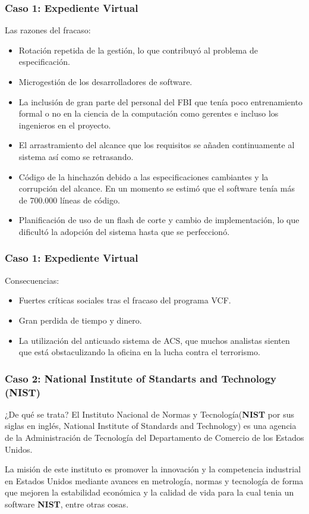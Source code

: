 \documentclass[11pt]{beamer}
\begin{document}
	\begin{frame}
		\frametitle{Caso 1: Expediente Virtual}
		\begin{block}{Las razones del fracaso:}
			\begin{itemize}
				\item Rotación repetida de la gestión, lo que contribuyó al problema de especificación.
				\item Microgestión de los desarrolladores de software.
				\item La inclusión de gran parte del personal del FBI que tenía poco entrenamiento formal o no en la ciencia de la computación como gerentes e incluso los ingenieros en el proyecto.
				\item El arrastramiento del alcance que los requisitos se añaden continuamente al sistema así como se retrasando.
				\item Código de la hinchazón debido a las especificaciones cambiantes y la corrupción del alcance. En un momento se estimó que el software tenía más de 700.000 líneas de código.
				\item Planificación de uso de un flash de corte y cambio de implementación, lo que dificultó la adopción del sistema hasta que se perfeccionó.
			\end{itemize}
		\end{block}
	\end{frame}

	\begin{frame}
		\frametitle{Caso 1: Expediente Virtual}
		\begin{block}{Consecuencias:}
			\begin{itemize}
				\item Fuertes críticas sociales tras el fracaso del programa VCF.
				\item Gran perdida de tiempo y dinero.
				\item La utilización del anticuado sistema de ACS, que muchos analistas sienten que está obstaculizando la oficina en la lucha contra el terrorismo.
			\end{itemize}
		\end{block}
	\end{frame}

	\begin{frame}
		\frametitle{Caso 2: National Institute of Standarts and Technology (NIST)}
		\begin{block}{¿De qué se trata?}
			El Instituto Nacional de Normas y Tecnología(\textbf{NIST} por sus siglas en inglés, National Institute of Standards and Technology) es una agencia de la Administración de Tecnología del Departamento de Comercio de los Estados Unidos.
			
			La misión de este instituto es promover la innovación y la competencia industrial en Estados Unidos mediante avances en metrología, normas y tecnología de forma que mejoren la estabilidad económica y la calidad de vida para la cual tenia un software \textbf{NIST}, entre otras cosas.
		\end{block}
	\end{frame}
\end{document}
